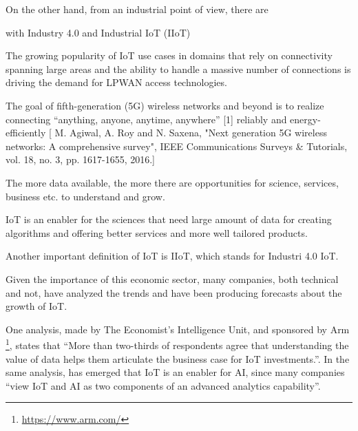 		
		On the other hand, from an industrial point of view, there are 
		
		
		with Industry 4.0 and Industrial IoT (IIoT)
		
		The growing popularity of IoT use cases in domains that rely on connectivity spanning large areas and the ability to handle a massive number of connections is driving the demand for LPWAN access technologies. 
		
		\vspace{3cm}
		
		The goal of fifth-generation (5G) wireless networks and beyond is to realize connecting “anything, anyone, anytime, anywhere” [1] reliably and energy-efficiently [ M. Agiwal, A. Roy and N. Saxena, "Next generation 5G wireless networks: A comprehensive survey", IEEE Communications Surveys \& Tutorials, vol. 18, no. 3, pp. 1617-1655, 2016.]
		
		The more data available, the more there are opportunities for science, services, business etc. to understand and grow.
		
		IoT is an enabler for the sciences that need large amount of data for creating algorithms and offering better services and more well tailored products.
		
		Another important definition of IoT is IIoT, which stands for Industri 4.0 IoT.
		
		Given the importance of this economic sector, many companies, both technical and not, have analyzed the trends and have been producing forecasts about the growth of IoT.
		
		One analysis, made by The Economist's Intelligence Unit, and sponsored by Arm \footnote{\url{https://www.arm.com/}}, states that ``More than two-thirds of respondents agree that understanding the value of data helps them articulate the business case for IoT investments.''\cite{economist-iot-business-index-2020-arm}.
		In the same analysis, has emerged that IoT is an enabler for AI, since many companies ``view IoT and AI as two components of an advanced analytics capability''.
		
